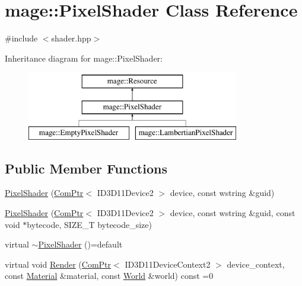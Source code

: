 \hypertarget{classmage_1_1_pixel_shader}{}\section{mage\+:\+:Pixel\+Shader Class Reference}
\label{classmage_1_1_pixel_shader}


{\ttfamily \#include $<$shader.\+hpp$>$}

Inheritance diagram for mage\+:\+:Pixel\+Shader\+:\begin{figure}[H]
\begin{center}
\leavevmode
\includegraphics[height=3.000000cm]{classmage_1_1_pixel_shader}
\end{center}
\end{figure}
\subsection*{Public Member Functions}
\begin{DoxyCompactItemize}
\item 
\hyperlink{classmage_1_1_pixel_shader_a9b47c1bfe4ae686e64e4c91fd8f6cbec}{Pixel\+Shader} (\hyperlink{namespacemage_ae74f374780900893caa5555d1031fd79}{Com\+Ptr}$<$ I\+D3\+D11\+Device2 $>$ device, const wstring \&guid)
\item 
\hyperlink{classmage_1_1_pixel_shader_a1683469d2d043f939866fb89fa775548}{Pixel\+Shader} (\hyperlink{namespacemage_ae74f374780900893caa5555d1031fd79}{Com\+Ptr}$<$ I\+D3\+D11\+Device2 $>$ device, const wstring \&guid, const void $\ast$bytecode, S\+I\+Z\+E\+\_\+T bytecode\+\_\+size)
\item 
virtual \hyperlink{classmage_1_1_pixel_shader_ac339b9196db24d18143ad36013d598b2}{$\sim$\+Pixel\+Shader} ()=default
\item 
virtual void \hyperlink{classmage_1_1_pixel_shader_a2e47b753e60dc05cf2cc9d4acb87c343}{Render} (\hyperlink{namespacemage_ae74f374780900893caa5555d1031fd79}{Com\+Ptr}$<$ I\+D3\+D11\+Device\+Context2 $>$ device\+\_\+context, const \hyperlink{structmage_1_1_material}{Material} \&material, const \hyperlink{classmage_1_1_world}{World} \&world) const =0
\end{DoxyCompactItemize}
